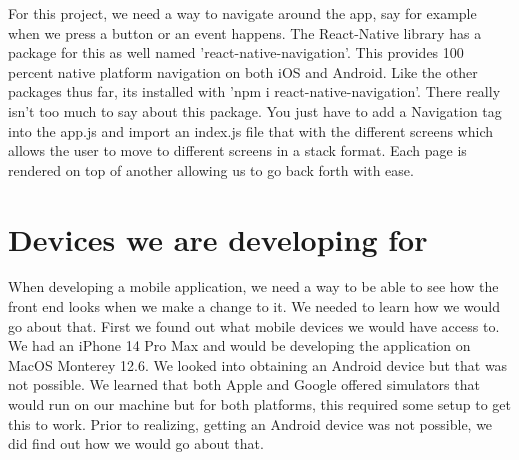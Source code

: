 For this project, we need a way to navigate around the app, say for example when we press a button or an event happens. The React-Native library has a package for this as well named 'react-native-navigation'. This provides 100 percent native platform navigation on both iOS and Android\cite{npmNavigation}. Like the other packages thus far, its installed with 'npm i react-native-navigation'. There really isn't too much to say about this package. You just have to add a Navigation tag into the app.js and import an index.js file that with the different screens which allows the user to move to different screens in a stack format. Each page is rendered on top of another allowing us to go back forth with ease. 

\section{Devices we are developing for}
When developing a mobile application, we need a way to be able to see how the front end looks when we make a change to it. We needed to learn how we would go about that. First we found out what mobile devices we would have access to. We had an iPhone 14 Pro Max and would be developing the application on MacOS Monterey 12.6. We looked into obtaining an Android device but that was not possible. We learned that both Apple and Google offered simulators that would run on our machine but for both platforms, this required some setup to get this to work. Prior to realizing, getting an Android device was not possible, we did find out how we would go about that.

